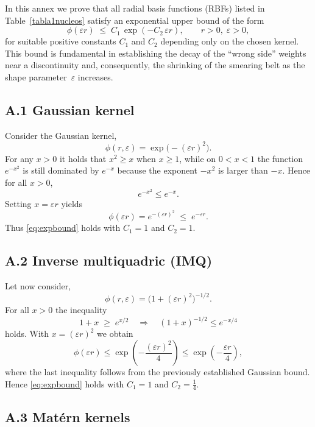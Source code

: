 \documentclass[preprint]{elsarticle}       %
\begin{document}
In this annex we prove that all radial basis functions (RBFs) listed in 
Table~\ref{tabla1nucleos} satisfy an exponential upper bound of the form
\begin{equation}
\label{eq:expbound}
\phi(\varepsilon r)\;\le\;C_1\,\exp(-C_2\,\varepsilon r),
\qquad r>0,\;\varepsilon>0,
\end{equation}
for suitable positive constants $C_1$ and $C_2$ depending only on the chosen
kernel.  This bound is fundamental in establishing the decay of the ``wrong
side'' weights near a discontinuity and, consequently, the shrinking of the
smearing belt as the shape parameter~$\varepsilon$ increases.

\subsection*{A.1 Gaussian kernel}
\vspace{0.5cm}

Consider the Gaussian kernel,
\[
\phi(r,\varepsilon)=\exp\!\bigl(-(\varepsilon r)^2\bigr).
\]
For any $x>0$ it holds that $x^2\ge x$ when $x\ge1$, while on $0<x<1$ the 
function $e^{-x^2}$ is still dominated by $e^{-x}$ because the exponent 
$-x^2$ is larger than $-x$.  Hence for all $x>0$,
\[
e^{-x^2} \le e^{-x}.
\]
Setting $x=\varepsilon r$ yields
\[
\phi(\varepsilon r)=e^{-(\varepsilon r)^2}
\;\le\;
e^{-\varepsilon r}.
\]
Thus \eqref{eq:expbound} holds with $C_1=1$ and $C_2=1$.

\subsection*{A.2 Inverse multiquadric (IMQ)}
\vspace{0.5cm}

Let now consider,
\[
\phi(r,\varepsilon)=\bigl(1+(\varepsilon r)^2\bigr)^{-1/2}.
\]
For all $x>0$ the inequality
\[
1+x \;\ge\; e^{x/2}
\quad \Longrightarrow \quad
(1+x)^{-1/2}\le e^{-x/4}
\]
holds.  With $x=(\varepsilon r)^2$ we obtain
\[
\phi(\varepsilon r)
\le \exp\!\left(-\frac{(\varepsilon r)^2}{4}\right)
\le \exp\!\left(-\frac{\varepsilon r}{4}\right),
\]
where the last inequality follows from the previously established Gaussian bound.
Hence \eqref{eq:expbound} holds with $C_1=1$ and $C_2=\tfrac14$.

\subsection*{A.3 Mat\'ern kernels}
\vspace{0.5cm}
\end{document}
